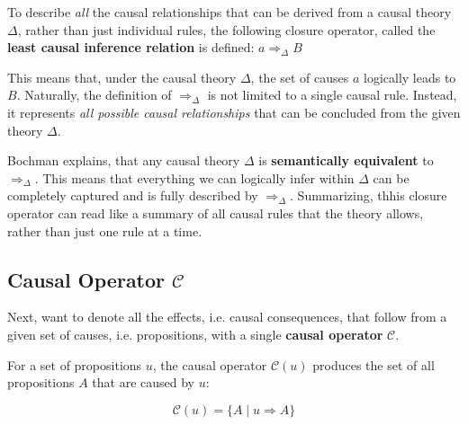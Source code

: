 \documentclass[seminar,palatino,english]{AIGpaper}
\newcommand{\ignore}[1]{}
\begin{document}
To describe \emph{all} the causal relationships that can be derived from a causal theory $ \Delta $, rather than just individual rules, the following closure operator, called the \textbf{least causal inference relation} is defined: $ a \Rightarrow_{\Delta} B$

This means that, under the causal theory $ \Delta $, the set of causes $ a $ logically leads to $ B $. Naturally, the definition of $ \Rightarrow_{\Delta} $ is not limited to a single causal rule. Instead, it represents \emph{all possible causal relationships} that can be concluded from the given theory $ \Delta $.

Bochman explains, that any causal theory $ \Delta $ is \textbf{semantically equivalent} to $ \Rightarrow_{\Delta} $. This means that everything we can logically infer within $ \Delta $ can be completely captured and is fully described by $ \Rightarrow_{\Delta} $. Summarizing, thhis closure operator can read like a summary of all causal rules that the theory allows, rather than just one rule at a time. 

\subsection{Causal Operator \texorpdfstring{$\mathcal{C}$}{C}}

\ignore{
    \begin{itemize}
        \item $\mathcal{C}(u)$: props. caused by $u$.
        \item Similar to derivability Th.
        \item Monotonicity, transitivity.
    \end{itemize}
}

Next, want to denote all the effects, i.e. causal consequences, that follow from a given set of causes, i.e. propositions, with a single \textbf{causal operator} $ \mathcal{C} $.

\begin{definition}
For a set of propositions $ u $, the causal operator $ \mathcal{C}(u) $ produces the set of all propositions $ A $ that are caused by $ u $:

\begin{equation}
    \mathcal{C}(u) = \{ A \mid u \Rightarrow A \}
\end{equation}
\end{definition}
\end{document}
